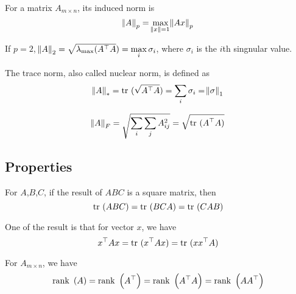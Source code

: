 \begin{definition}
   For a matrix $A_{m \times n}$, its induced norm is
\begin{equation}
    \norm{A}_p = \max\limits_{\norm{x}=1} \norm{Ax}_p
\end{equation}

If $p=2$, $\norm{A}_2 = \sqrt{\lambda_{\mathrm{max}} ( {A}^\top A}) = \max\limits_i \sigma_i$, where $\sigma_i$ is the $i$th singnular value.
 
\end{definition}

\begin{definition}
    The trace norm, also called nuclear norm, is defined as
\begin{equation}
    \norm{A}_* = \displaystyle \mathrm{tr}~( \sqrt{{A}^\top A} ) = \sum_i \sigma_i = \norm{\sigma}_1
\end{equation}
\end{definition}

\begin{definition}
    \begin{equation}
        \norm{A}_F = \sqrt{\sum_i \sum_j A_{ij}^2} = \sqrt{\displaystyle \mathrm{tr}~( {A}^\top A )}
    \end{equation}
\end{definition}


\subsection{Properties}

\begin{theorem}
    For $A$,$B$,$C$, if the result of $ABC$ is a square matrix, then
    \begin{equation}
        \displaystyle \mathrm{tr}~( ABC ) = \displaystyle \mathrm{tr}~( BCA ) = \displaystyle \mathrm{tr}~( CAB )
    \end{equation}
    
    One of the result is that for vector $x$, we have
    \begin{equation}
        {x}^\top A x = \displaystyle \mathrm{tr}~( {x}^\top Ax ) = \displaystyle \mathrm{tr}~( x {x}^\top A )
    \end{equation}
\end{theorem}

\begin{theorem}
    For $A_{m \times n}$, we have
    \begin{equation}
        \displaystyle \mathrm{rank}~\left( A \right) = \displaystyle \mathrm{rank}~\left( {A}^\top \right) = \displaystyle \mathrm{rank}~\left( {A}^\top A \right) = \displaystyle \mathrm{rank}~\left( A {A}^\top \right)
    \end{equation}    
\end{theorem}


